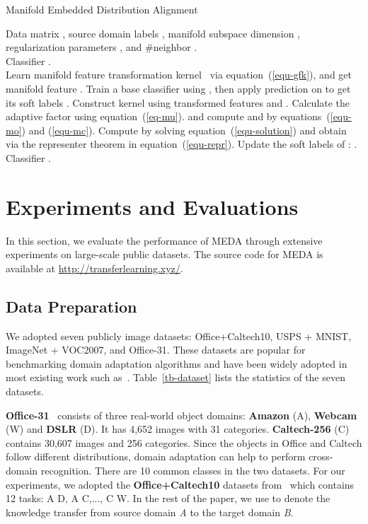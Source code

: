 \documentclass[sigconf]{acmart}
\begin{document}
\begin{algorithm}[t!] 
	\caption{Manifold Embedded Distribution Alignment}  
	\label{algo-meda}  
	\renewcommand{\algorithmicrequire}{\textbf{Input:}} 
	\renewcommand{\algorithmicensure}{\textbf{Output:}}
	\begin{algorithmic}[1]  
		\REQUIRE 
		Data matrix , source domain labels , manifold subspace dimension , regularization parameters , and \#neighbor .\\
		\ENSURE 
		Classifier .\\
		\STATE Learn manifold feature transformation kernel~ via equation~(\ref{equ-gfk}), and get manifold feature .
		\STATE Train a base classifier using , then apply prediction on  to get its soft labels . 
		\STATE Construct kernel  using transformed features  and .
		\REPEAT 
		\STATE Calculate the adaptive factor  using equation~(\ref{eq-mu}).
		 and compute  and  by equations~(\ref{equ-mo}) and (\ref{equ-mc}).
		\STATE Compute  by solving equation~(\ref{equ-solution}) and obtain  via the representer theorem in equation~(\ref{equ-repr}).
		\STATE Update the soft labels of : .
		\RETURN Classifier .  
	\end{algorithmic}  
\end{algorithm}

\section{Experiments and Evaluations}
\label{sec-exp}
In this section, we evaluate the performance of MEDA through extensive experiments on large-scale public datasets. The source code for MEDA is available at \url{http://transferlearning.xyz/}.

\subsection{Data Preparation}
\label{sec-exp-data}

We adopted seven publicly image datasets: Office+Caltech10, USPS + MNIST, ImageNet + VOC2007, and Office-31. These datasets are popular for benchmarking domain adaptation algorithms and have been widely adopted in most existing work such as~\cite{gong2012geodesic,long2014adaptation,zhang2017joint,zhuo2017deep}. Table~\ref{tb-dataset} lists the statistics of the seven datasets.

\textbf{Office-31}~\cite{saenko2010adapting} consists of three real-world object domains: \textbf{Amazon} (A), \textbf{Webcam} (W) and \textbf{DSLR} (D). It has 4,652 images with 31 categories. \textbf{Caltech-256} (C) contains 30,607 images and 256 categories. Since the objects in Office and Caltech follow different distributions, domain adaptation can help to perform cross-domain recognition. There are 10 common classes in the two datasets. For our experiments, we adopted the \textbf{Office+Caltech10} datasets from~\cite{gong2012geodesic} which contains 12 tasks: A  D, A  C,..., C  W. In the rest of the paper, we use  to denote the knowledge transfer from source domain \textit{A} to the target domain \textit{B}.
\end{document}
